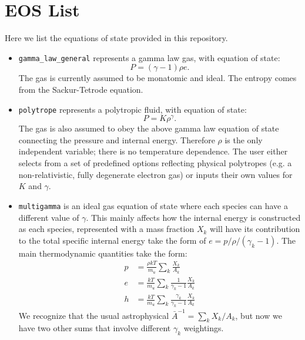 \documentclass[11pt]{book}
\begin{document}
\section{EOS List}

Here we list the equations of state provided in this repository.

\begin{itemize}

\item {\tt gamma\_law\_general} represents a gamma law gas, with equation of state:
\begin{equation}
  P = (\gamma - 1) \rho e.
\end{equation}
The gas is currently assumed to be monatomic and ideal. The entropy comes from the Sackur-Tetrode equation.

\item {\tt polytrope} represents a polytropic fluid, with equation of state:
\begin{equation}
  P = K \rho^\gamma.
\end{equation}
The gas is also assumed to obey the above gamma law equation of state
connecting the pressure and internal energy. Therefore $\rho$ is the
only independent variable; there is no temperature dependence. The
user either selects from a set of predefined options reflecting
physical polytropes (e.g. a non-relativistic, fully degenerate
electron gas) or inputs their own values for $K$ and $\gamma$.

\item {\tt multigamma} is an ideal gas equation of state where each
  species can have a different value of $\gamma$.  This mainly affects
  how the internal energy is constructed as each species, represented
  with a mass fraction $X_k$ will have its contribution to the total
  specific internal energy take the form of $e = p/\rho/(\gamma_k -
  1)$.  The main thermodynamic quantities take the form:
\begin{align}
p &= \frac{\rho k T}{m_u} \sum_k \frac{X_k}{A_k} \\
e &= \frac{k T}{m_u} \sum_k \frac{1}{\gamma_k - 1} \frac{X_k}{A_k} \\
h &= \frac{k T}{m_u} \sum_k \frac{\gamma_k}{\gamma_k - 1} \frac{X_k}{A_k}
\end{align}
We recognize that the usual astrophysical $\bar{A}^{-1} = \sum_k
X_k/A_k$, but now we have two other sums that involve different
$\gamma_k$ weightings.


\end{itemize}
\end{document}
